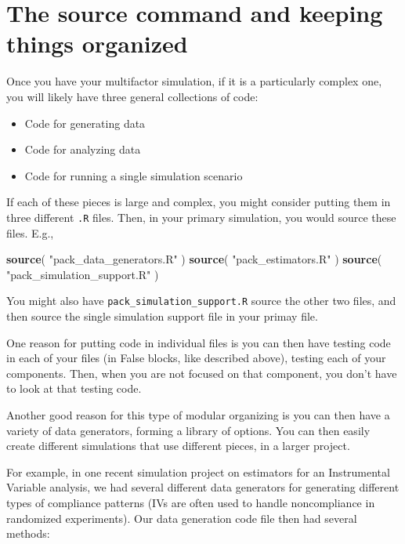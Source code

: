 \documentclass[
]{book}
\newenvironment{Shaded}{\begin{snugshade}}{\end{snugshade}}
\newcommand{\FunctionTok}[1]{\textcolor[rgb]{0.13,0.29,0.53}{\textbf{#1}}}
\newcommand{\NormalTok}[1]{#1}
\newcommand{\StringTok}[1]{\textcolor[rgb]{0.31,0.60,0.02}{#1}}
\providecommand{\tightlist}{%
  \setlength{\itemsep}{0pt}\setlength{\parskip}{0pt}}
\begin{document}
\section{The source command and keeping things organized}\label{the-source-command-and-keeping-things-organized}

Once you have your multifactor simulation, if it is a particularly complex one, you will likely have three general collections of code:

\begin{itemize}
\tightlist
\item
  Code for generating data
\item
  Code for analyzing data
\item
  Code for running a single simulation scenario
\end{itemize}

If each of these pieces is large and complex, you might consider putting them in three different \texttt{.R} files.
Then, in your primary simulation, you would source these files.
E.g.,

\begin{Shaded}
\begin{Highlighting}[]
\FunctionTok{source}\NormalTok{( }\StringTok{"pack\_data\_generators.R"}\NormalTok{ )}
\FunctionTok{source}\NormalTok{( }\StringTok{"pack\_estimators.R"}\NormalTok{ )}
\FunctionTok{source}\NormalTok{( }\StringTok{"pack\_simulation\_support.R"}\NormalTok{ )}
\end{Highlighting}
\end{Shaded}

You might also have \texttt{pack\_simulation\_support.R} source the other two files, and then source the single simulation support file in your primay file.

One reason for putting code in individual files is you can then have testing code in each of your files (in False blocks, like described above), testing each of your components.
Then, when you are not focused on that component, you don't have to look at that testing code.

Another good reason for this type of modular organizing is you can then have a variety of data generators, forming a library of options.
You can then easily create different simulations that use different pieces, in a larger project.

For example, in one recent simulation project on estimators for an Instrumental Variable analysis, we had several different data generators for generating different types of compliance patterns (IVs are often used to handle noncompliance in randomized experiments).
Our data generation code file then had several methods:
\end{document}
